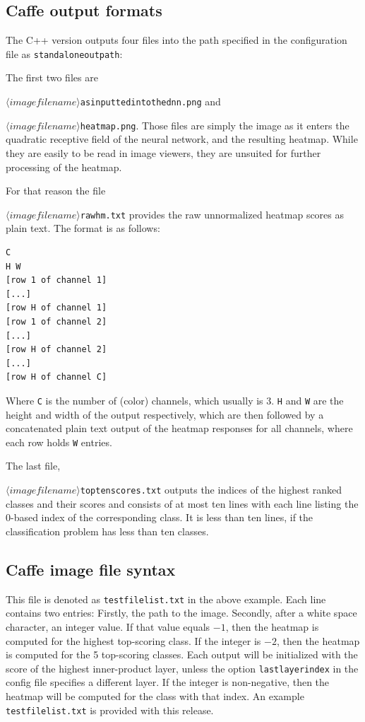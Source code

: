 \documentclass[a4wide]{article}
\begin{document}
\subsection*{Caffe output formats}


The C++ version outputs four files into the path specified in the configuration file as \texttt{standalone\textunderscore outpath}:

The first two files are 

\texttt{$\langle imagefilename\rangle$\textunderscore as\textunderscore inputted\textunderscore into\textunderscore the\textunderscore dnn.png} and 

\texttt{$\langle imagefilename\rangle$\textunderscore heatmap.png}. Those files are simply the image as it enters the quadratic receptive field of the neural network, and the resulting heatmap. While they are easily to be read in image viewers, they are unsuited for further processing of the heatmap.

For that reason the file 

\texttt{$\langle imagefilename\rangle$\textunderscore rawhm.txt} provides the raw unnormalized heatmap scores as plain text. 
The format is as follows: 

\begin{Verbatim}[frame=single]
C
H W
[row 1 of channel 1]
[...]
[row H of channel 1]
[row 1 of channel 2]
[...]
[row H of channel 2]
[...]
[row H of channel C]
\end{Verbatim}

Where \texttt{C} is the number of (color) channels, which usually is 3. \texttt{H} and \texttt{W} are the height and width of the output respectively, which are then followed by a concatenated plain text output of the heatmap responses for all channels, where each row holds \texttt{W} entries.


The last file,

\texttt{$\langle imagefilename\rangle$\textunderscore toptenscores.txt} outputs the indices of the highest ranked classes and their scores and consists of at most ten lines with each line listing the 0-based index of the corresponding class. It is less than ten lines, if the classification problem has less than ten classes.


\subsection*{Caffe image file syntax}

This file is denoted as \texttt{testfilelist.txt} in the above example. Each line contains two entries: Firstly, the path to the image. Secondly, after a white space character, an integer value.
If that value equals $-1$, then the heatmap is computed for the highest top-scoring class. If the integer is $-2$, then the heatmap is computed for the 5 top-scoring classes. Each output will be initialized with the score of the highest inner-product layer, unless the option \texttt{lastlayerindex} in the config file specifies a different layer. If the integer is non-negative, then the heatmap will be computed for the class with that index. An example \texttt{testfilelist.txt} is provided with this release.
\end{document}
